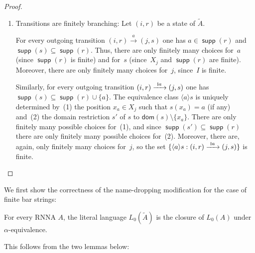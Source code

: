 \documentclass[final,a4paper,UKenglish,thm-restate,autoref,numberwithinsect]{lipics-v2021}
\newcommand{\scriptmidmid}{\hspace{0.2ex}{\rule[-0.1ex]{0.6pt}{1.1ex}}\hspace{0.2ex}}
\newcommand{\compr}{:}
\newcommand{\scriptnew}[1]{{\scriptmidmid}#1}
\numberwithin{equation}{section}
\newcommand{\xto}[1]{\xrightarrow{~#1~}}
\newcommand{\seq}{\subseteq}
\newcommand{\tl}{\widetilde}
\newcommand{\dom}{\mathsf{dom}}
\newcommand{\braket}[1]{\langle #1 \rangle}
\newcommand{\+}[1]{\mathcal{#1}\xspace}
\DeclareMathOperator{\supp}{\mathsf{supp}} %
\theoremstyle{definition}
\begin{document}
\begin{proof}
\begin{enumerate}
  \item Transitions are finitely branching: Let $(i,r)$ be a state of
    $\tl{A}$.

    For every outgoing transition $(i,r)\xto{a}(j,s)$ one has
    $a\in \supp(r)$ and $\supp(s)\seq \supp(r)$. Thus, there are only
    finitely many choices for~$a$ (since $\supp(r)$ is finite) and
    for~$s$ (since~$X_j$ and $\supp(r)$ are finite). Moreover, there
    are only finitely many choices for~$j$, since~$I$ is finite.

    Similarly, for every outgoing transition $(i,r)\xto{\scriptnew a} (j,s)$ one
    has $\supp(s)\seq \supp(r)\cup \{a\}$. The equivalence class
    $\braket{a} s$ is uniquely determined by~(1) the position
    $x_a\in X_j$ such that $s(x_a)=a$ (if any) and~(2) the domain
    restriction $s'$ of $s$ to $\dom(s)\setminus \{x_a\}$. There are
    only finitely many possible choices for~(1), and since
    $\supp(s')\seq \supp(r)$ there are only finitely many possible
    choices for~(2). Moreover, there are, again, only finitely many
    choices for~$j$, so the set
    $\{ \braket{a} s \compr (i,r)\xto{\scriptnew a}(j,s) \}$ is finite.\qedhere
  \end{enumerate}
\end{proof}

We first show the correctness of the name-dropping modification for the case of finite bar strings:

\begin{theorem}\label{thm:ncd_rnna}
  For every RNNA $A$, the literal language $L_0(\tl{A})$ is the closure of $L_0(A)$
  under $\alpha$-equivalence.
\end{theorem}
This follows from the two lemmas below:
\end{document}
